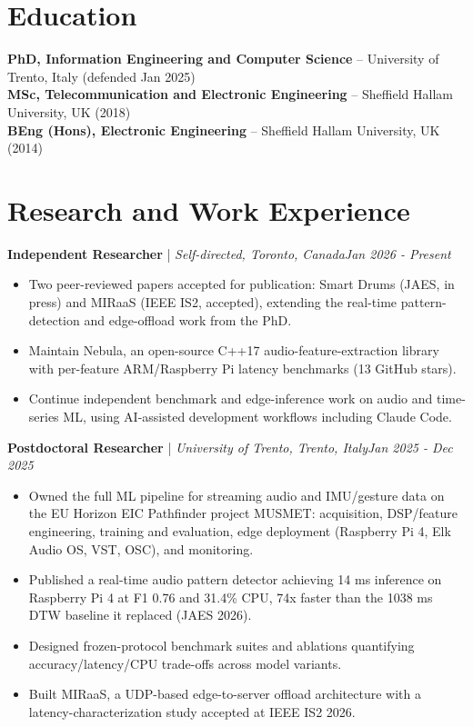\documentclass[11pt]{article}
\newenvironment{cvrole}[5]{%
  \par\noindent\textbf{\large #1} | \textit{\small #2, #3}\hfill \textit{\small #4 - #5}\par
  \begin{itemize}[leftmargin=2em, itemsep=-0.3em, topsep=-0.5em]%
}{%
  \end{itemize}\par\noindent\mbox{}\par\vspace{0.1em}%
}
\begin{document}
\section*{Education}
\textbf{PhD, Information Engineering and Computer Science} -- University of Trento, Italy (defended Jan 2025)\\
\textbf{MSc, Telecommunication and Electronic Engineering} -- Sheffield Hallam University, UK (2018)\\
\textbf{BEng (Hons), Electronic Engineering} -- Sheffield Hallam University, UK (2014)

\section*{Research and Work Experience}

\begin{cvrole}{Independent Researcher}{Self-directed}{Toronto, Canada}{Jan 2026}{Present}
\item Two peer-reviewed papers accepted for publication: Smart Drums (JAES, in press) and MIRaaS (IEEE IS2, accepted), extending the real-time pattern-detection and edge-offload work from the PhD.
\item Maintain Nebula, an open-source C++17 audio-feature-extraction library with per-feature ARM/Raspberry Pi latency benchmarks (13 GitHub stars).
\item Continue independent benchmark and edge-inference work on audio and time-series ML, using AI-assisted development workflows including Claude Code.
\end{cvrole}

\begin{cvrole}{Postdoctoral Researcher}{University of Trento}{Trento, Italy}{Jan 2025}{Dec 2025}
\item Owned the full ML pipeline for streaming audio and IMU/gesture data on the EU Horizon EIC Pathfinder project MUSMET: acquisition, DSP/feature engineering, training and evaluation, edge deployment (Raspberry Pi 4, Elk Audio OS, VST, OSC), and monitoring.
\item Published a real-time audio pattern detector achieving 14 ms inference on Raspberry Pi 4 at F1 0.76 and 31.4\% CPU, 74x faster than the 1038 ms DTW baseline it replaced (JAES 2026).
\item Designed frozen-protocol benchmark suites and ablations quantifying accuracy/latency/CPU trade-offs across model variants.
\item Built MIRaaS, a UDP-based edge-to-server offload architecture with a latency-characterization study accepted at IEEE IS2 2026.
\end{cvrole}
\end{document}
